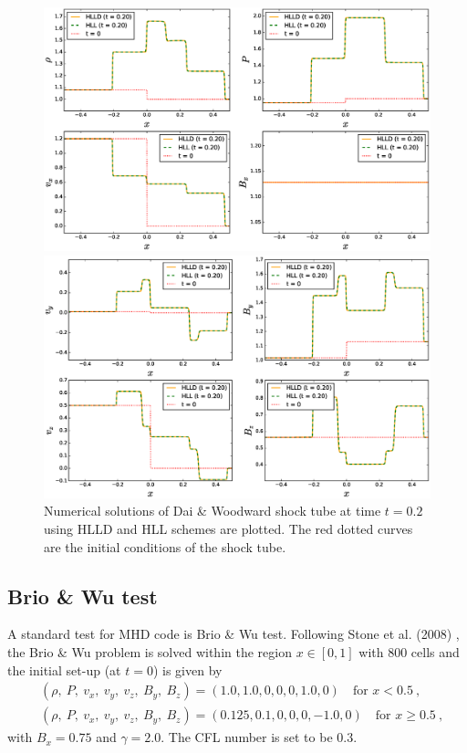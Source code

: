 \documentclass[10.5pt]{article}
\begin{document}
\begin{figure}[ht]
	\centering
	\begin{minipage}[c]{0.9\textwidth}
		\includegraphics[width=1\textwidth]{DW1.eps}
	\end{minipage}
	\begin{minipage}[c]{0.9\textwidth}
		\includegraphics[width=1\textwidth]{DW2.eps}
	\end{minipage}%
\caption{Numerical solutions of Dai \& Woodward shock tube at time $t=0.2$ using HLLD and HLL 
schemes are plotted. The red dotted curves are the initial conditions of the shock tube.}
\label{fig: DW shock test}
\end{figure}

\clearpage

\subsection{Brio \& Wu test}
A standard test for MHD code is Brio \& Wu test. Following Stone et al. (2008) \cite{stone2008athena}, the Brio \& Wu problem is solved within the region 
$x \in [0,1]$ with 800 cells  and the initial set-up (at $t=0$) is given by 
\begin{align}
&(\rho,\ P,\ v_x,\ v_y,\ v_z,\ B_y,\ B_z) = (1.0, 1.0, 0, 0, 0, 1.0, 0) \quad
\text{for } x<0.5 \ , \\
&(\rho,\ P,\ v_x,\ v_y,\ v_z,\ B_y,\ B_z) = (0.125, 0.1, 0, 0, 0, -1.0,0) \quad
\text{for } x\geq0.5  \ , 
\end{align}
with $B_x = 0.75$ and $\gamma = 2.0$. The CFL number is set to be 0.3.
\end{document}
